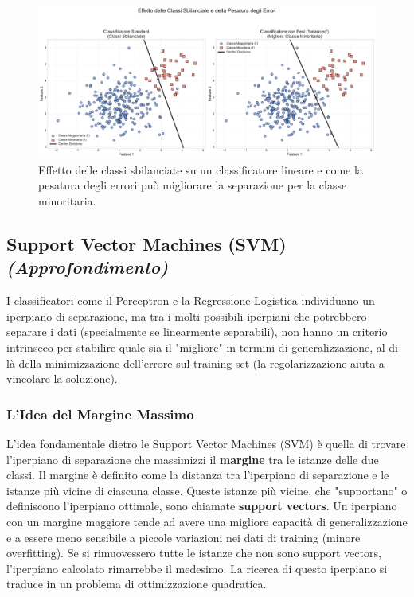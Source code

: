 \documentclass{article}
\begin{document}
\begin{figure}[H]
    \centering
    \includegraphics[width=1\textwidth]{images/imbalanced_classes.pdf}
    \caption{Effetto delle classi sbilanciate su un classificatore lineare e come la pesatura degli errori può migliorare la separazione per la classe minoritaria.}
    \label{fig:imbalanced_classes}
\end{figure}

\customhr
\subsection{Support Vector Machines (SVM) \textit{(Approfondimento)}}
I classificatori come il Perceptron e la Regressione Logistica individuano un iperpiano di separazione, ma tra i molti possibili iperpiani che potrebbero separare i dati (specialmente se linearmente separabili), non hanno un criterio intrinseco per stabilire quale sia il "migliore" in termini di generalizzazione, al di là della minimizzazione dell'errore sul training set (la regolarizzazione aiuta a vincolare la soluzione).

\subsubsection{L'Idea del Margine Massimo}
L'idea fondamentale dietro le Support Vector Machines (SVM) è quella di trovare l'iperpiano di separazione che massimizzi il \textbf{margine} tra le istanze delle due classi. Il margine è definito come la distanza tra l'iperpiano di separazione e le istanze più vicine di ciascuna classe. Queste istanze più vicine, che "supportano" o definiscono l'iperpiano ottimale, sono chiamate \textbf{support vectors}.
Un iperpiano con un margine maggiore tende ad avere una migliore capacità di generalizzazione e a essere meno sensibile a piccole variazioni nei dati di training (minore overfitting). Se si rimuovessero tutte le istanze che non sono support vectors, l'iperpiano calcolato rimarrebbe il medesimo.
La ricerca di questo iperpiano si traduce in un problema di ottimizzazione quadratica.
\end{document}
